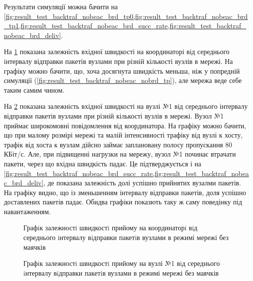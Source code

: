 \documentclass[a4paper,ukrainian,utf8,nocolumnsxix,floatsection,equationsection]{eskdtext}
\begin{document}
Результати симуляції можна бачити на \cref{fig:result_test_backtraf_nobeac_brd_tp0,fig:result_test_backtraf_nobeac_brd_tp1,fig:result_test_backtraf_nobeac_brd_succ_rate,fig:result_test_backtraf_nobeac_brd_deliv}.

На \cref{fig:result_test_backtraf_nobeac_brd_tp0} показана залежність вхідної швидкості на координаторі від середнього інтервалу відправки пакетів вузлами при різній кількості вузлів в мережі. На графіку можно бачити, що, хоча досягнута швидкість меньша, ніж у попредній симуляції (\cref{fig:result_test_backtraf_nobeac_nobrd_tp}), але мережа веде себе таким самим чином.

На \cref{fig:result_test_backtraf_nobeac_brd_tp1} показана залежність вхідної швидкості на вузлі №1 від середнього інтервалу відправки пакетів вузлами при різній кількості вузлів в мережі. Вузол №1 приймає широкомовні повідомлення від координатора. На графіку можно бачити, що при малому розмірі мережі та малій інтенсивності трафіку від вузлі к хосту, трафік від хоста к вузлам дійсно займає заплановану полосу пропускання 80 КБіт/с. Але, при підвищенні нагрузки на мережу, вузол №1 починає втрачати пакети, через що вхідна швидкість падає. Це підтверджується і на \cref{fig:result_test_backtraf_nobeac_brd_succ_rate,fig:result_test_backtraf_nobeac_brd_deliv}, де показана залежність долі успішно прийнятих вузалми пакетів. На графіку видно, що із зменьшенням інтервалу відправки пакетів, доля успішно доставлених пакетів падає. Обидва графіки показють таку ж саму поведінку під навантаженням. 

\begin{figure}[h]
	\centering
	\caption{\label{fig:result_test_backtraf_nobeac_brd_tp0}Графiк залежностi швидкостi прийому на координаторi вiд середнього iнтервалу вiдправки пакетiв вузлами в режимі мережі без маячків}
\end{figure}


\begin{figure}[h]
	\centering
	\caption{\label{fig:result_test_backtraf_nobeac_brd_tp1}Графiк залежностi швидкостi прийому на вузлі №1 вiд середнього iнтервалу вiдправки пакетiв вузлами в режимі мережі без маячків}
\end{figure}
\end{document}
